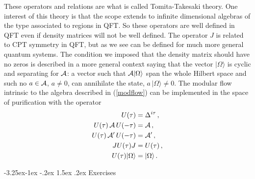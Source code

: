 \documentclass[11pt]{article}
\makeatletter
\renewcommand\subsection{\@startsection{subsection}{2}{\z@}%
                                   {-3.25ex\@plus -1ex \@minus -.2ex}%
                                     {1.5ex \@plus .2ex}%
                                     {\normalfont\bfseries}}
\numberwithin{equation}{section}
\makeatother
\begin{document}
These operators and relations are what is called Tomita-Takesaki theory. One interest of this theory is that the scope extends to infinite dimensional algebras of the type associated to regions in QFT. So these operators are well defined in QFT even if density matrices will not be well defined. The operator $J$ is related to CPT symmetry in QFT, but as we see can be defined for much more general quantum systems. The condition we imposed that the density matrix should have no zeros is described in a more general context saying that the vector $|\Omega\rangle$ is 
 cyclic and separating for ${\cal A}$: a vector such that ${\cal A} \vert \Omega \rangle$ span the whole Hilbert space and such no $a\in {\cal A}$, $a\neq 0$,  can annihilate the state, $a\,|\Omega \rangle \neq 0$. The modular flow intrinsic to the algebra described in (\ref{modflow}) can be implemented in the space of purification with the operator  
\begin{align}
 U(\tau)&=\Delta^{i \tau}\,, \nonumber\\
 U(\tau)\,{\cal A}\, U(-\tau)&= {\cal A}\,,\nonumber\\
 U(\tau)\,{\cal A}'\, U(-\tau)&= {\cal A}'\,,\nonumber\\
 J U(\tau) J&=U(\tau)\,,\nonumber\\
  U(\tau)|\Omega \rangle &=|\Omega \rangle\,.
\end{align}

\subsection{Exercises}
\end{document}
